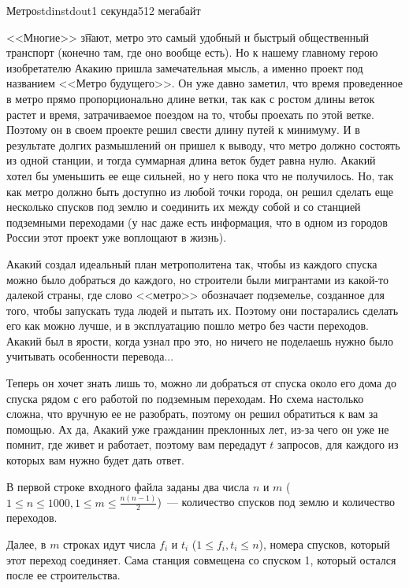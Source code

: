 \begin{problem}{Метро}{stdin}{stdout}{1 секунда}{512 мегабайт}

<<Многие>> \t{знают},  метро это самый удобный и быстрый общественный транспорт (конечно там, где оно вообще есть). Но к нашему главному герою изобретателю Акакию пришла замечательная мысль, а именно проект под названием <<Метро будущего>>. Он уже давно заметил, что время проведенное в метро прямо пропорционально длине ветки, так как с ростом длины веток растет и время, затрачиваемое поездом на то, чтобы проехать по этой ветке. Поэтому он в своем проекте решил свести длину путей к минимуму. И в результате долгих размышлений он пришел к выводу, что метро должно состоять из одной станции, и тогда суммарная длина веток будет равна нулю. Акакий хотел бы уменьшить ее еще сильней, но у него пока что не получилось. Но, так как метро должно быть доступно из любой точки города, он решил сделать еще несколько спусков под землю и соединить их между собой и со станцией подземными переходами (у нас даже есть информация, что в одном из городов России этот проект уже воплощают в жизнь). 

Акакий создал идеальный план метрополитена так, чтобы из каждого спуска можно было добраться до каждого, но строители были мигрантами из какой-то далекой страны, где слово <<метро>> обозначает подземелье, созданное для того, чтобы запускать туда людей и пытать их. Поэтому они постарались сделать его как можно лучше, и в эксплуатацию пошло метро без части переходов. Акакий был в ярости, когда узнал про это, но ничего не поделаешь нужно было учитывать особенности перевода... 

Теперь он хочет знать лишь то, можно ли добраться от спуска около его дома до спуска рядом с его работой по подземным переходам. Но схема настолько сложна, что вручную ее не разобрать, поэтому он решил обратиться к вам за помощью. Ах да, Акакий уже гражданин преклонных лет, из-за чего он уже не помнит, где живет и работает, поэтому вам передадут $t$ запросов, для каждого из которых вам нужно будет дать ответ. 

\InputFile
В первой строке входного файла заданы два числа $n$ и $m$ ($1 \le n \le 1000, 1 \le m \le \frac{n(n-1)}{2}$)~--- количество спусков под землю и количество переходов.

Далее, в $m$ строках идут числа $f_i$ и $t_i$ ($1 \le f_i, t_i \le n$), номера спусков, который этот переход соединяет. Сама станция совмещена со спуском 1, который остался после ее строительства.


\end{problem}
